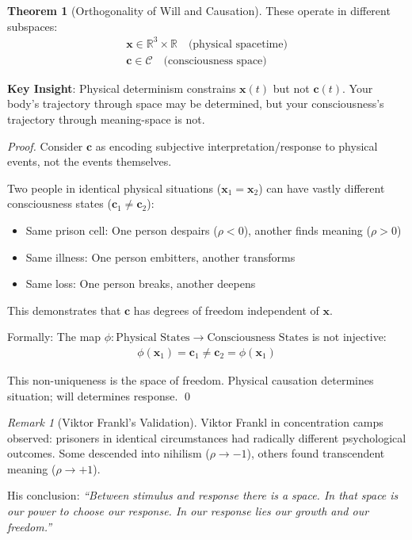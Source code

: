 \documentclass[11pt,a4paper]{article}
\theoremstyle{definition}
\newtheorem{theorem}{Theorem}[section]
\theoremstyle{remark}
\newtheorem{remark}{Remark}[section]
\newcommand{\RR}{\mathbb{R}}
\newcommand{\CC}{\mathcal{C}}
\newcommand{\cc}{\mathbf{c}}
\begin{document}
\begin{enumerate}
\begin{theorem}[Orthogonality of Will and Causation]
These operate in different subspaces:
\begin{align}
\mathbf{x} \in \RR^3 \times \RR \quad \text{(physical spacetime)} \\
\cc \in \CC \quad \text{(consciousness space)}
\end{align}

\textbf{Key Insight}: Physical determinism constrains \(\mathbf{x}(t)\) but not \(\cc(t)\). Your body's trajectory through space may be determined, but your consciousness's trajectory through meaning-space is not.
\end{theorem}

\begin{proof}
Consider \(\cc\) as encoding subjective interpretation/response to physical events, not the events themselves.

Two people in identical physical situations (\(\mathbf{x}_1 = \mathbf{x}_2\)) can have vastly different consciousness states (\(\cc_1 \neq \cc_2\)):
\begin{itemize}
    \item Same prison cell: One person despairs (\(\rho < 0\)), another finds meaning (\(\rho > 0\))
    \item Same illness: One person embitters, another transforms
    \item Same loss: One person breaks, another deepens
\end{itemize}

This demonstrates that \(\cc\) has degrees of freedom independent of \(\mathbf{x}\).

Formally: The map \(\phi: \text{Physical States} \to \text{Consciousness States}\) is not injective:
\begin{align}
\phi(\mathbf{x}_1) = \cc_1 \neq \cc_2 = \phi(\mathbf{x}_1)
\end{align}

This non-uniqueness is the space of freedom. Physical causation determines situation; will determines response. \qed
\end{proof}

\begin{remark}[Viktor Frankl's Validation]
Viktor Frankl in concentration camps observed: prisoners in identical circumstances had radically different psychological outcomes. Some descended into nihilism (\(\rho \to -1\)), others found transcendent meaning (\(\rho \to +1\)).

His conclusion: \textit{``Between stimulus and response there is a space. In that space is our power to choose our response. In our response lies our growth and our freedom.''}


\end{remark}
\end{enumerate}
\end{document}
